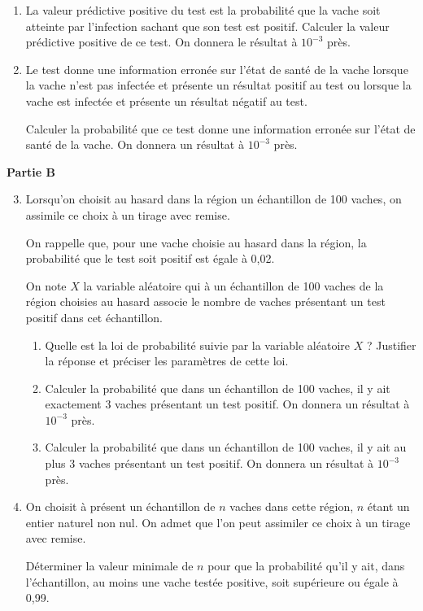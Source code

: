 \begin{enumerate}
\begin{enumerate}
		\item La \og{}valeur prédictive positive du test\fg{} est la probabilité que la vache soit atteinte par l'infection sachant que son test est positif. Calculer la valeur prédictive positive de ce test. On donnera le résultat à $10^{-3}$ près.

		\item Le test donne une information erronée sur l'état de santé de la vache lorsque la vache n'est pas infectée et présente un résultat positif au test ou lorsque la vache est infectée et présente un résultat négatif au test.

		Calculer la probabilité que ce test donne une information erronée sur l'état de santé de la vache. On donnera un résultat à $10^{-3}$ près.
	\end{enumerate}
\end{enumerate}


\textbf{Partie B}

\smallskip

\begin{enumerate}
\setcounter{enumi}{2}
	\item Lorsqu'on choisit au hasard dans la région un échantillon de 100 vaches, on assimile ce choix à un tirage avec remise.

	On rappelle que, pour une vache choisie au hasard dans la région, la probabilité que le test soit positif est égale à 0,02.

	On note $X$ la variable aléatoire qui à un échantillon de 100 vaches de la région choisies au hasard associe le nombre de vaches présentant un test positif dans cet échantillon.

	\begin{enumerate}
		\item Quelle est la loi de probabilité suivie par la variable aléatoire $X$ ? Justifier la réponse et préciser les paramètres de cette loi.

		\item Calculer la probabilité que dans un échantillon de 100 vaches, il y ait exactement 3 vaches présentant un test positif. On donnera un résultat à $10^{-3}$ près.

		\item Calculer la probabilité que dans un échantillon de 100 vaches, il y ait au plus 3 vaches présentant un test positif. On donnera un résultat à $10^{-3}$ près.
	\end{enumerate}

	\item On choisit à présent un échantillon de $n$ vaches dans cette région, $n$ étant un entier naturel non nul. On admet que l'on peut assimiler ce choix à un tirage avec remise.

	Déterminer la valeur minimale de $n$ pour que la probabilité qu'il y ait, dans l'échantillon, au moins une vache testée positive, soit supérieure ou égale à 0,99.
\end{enumerate}

\vspace{1cm}
